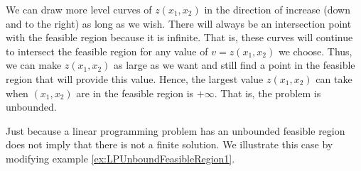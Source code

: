 \begin{solution}
We can draw more level curves of $z(x_1,x_2)$  in the direction of increase (down and to the right) as long as we wish. There will always be an intersection point with the feasible region because it is infinite. That is, these curves will continue to intersect the feasible region for any value of $v = z(x_1,x_2)$ we choose. Thus, we can make $z(x_1,x_2)$ as large as we want and still find a point in the feasible region that will provide this value. Hence, the largest value $z(x_1,x_2)$ can take when $(x_1,x_2)$ are in the feasible region is $+\infty$. That is, the problem is unbounded.
\label{ex:LPUnboundFeasibleRegion1}
\end{solution}

Just because a linear programming problem has an unbounded feasible region does not imply that there is not a finite solution. We illustrate this case by modifying example \ref{ex:LPUnboundFeasibleRegion1}. 

